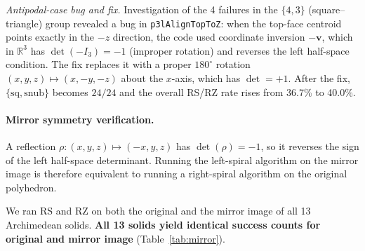 \documentclass[12pt,a4paper]{article}
\theoremstyle{definition}
\begin{document}
\emph{Antipodal-case bug and fix.}
Investigation of the 4 failures in the $\{4,3\}$ (square--triangle) group
revealed a bug in \texttt{p3lAlignTopToZ}: when the top-face centroid points
exactly in the $-z$ direction, the code used coordinate inversion $-\mathbf{v}$,
which in $\mathbb{R}^3$ has $\det(-I_3)=-1$ (improper rotation) and reverses
the left half-space condition.
The fix replaces it with a proper $180^\circ$ rotation
$(x,y,z)\mapsto(x,-y,-z)$ about the $x$-axis, which has $\det=+1$.
After the fix, $\{\mathrm{sq},\mathrm{snub}\}$ becomes $24/24$
and the overall RS/RZ rate rises from 36.7\% to 40.0\%.

\paragraph{Mirror symmetry verification.}
A reflection $\rho\colon(x,y,z)\mapsto(-x,y,z)$ has $\det(\rho)=-1$, so it
reverses the sign of the left half-space determinant.
Running the left-spiral algorithm on the mirror image is therefore equivalent
to running a right-spiral algorithm on the original polyhedron.

We ran RS and RZ on both the original and the mirror image of all 13
Archimedean solids.
\textbf{All 13 solids yield identical success counts for original and mirror image}
(Table~\ref{tab:mirror}).
\end{document}
